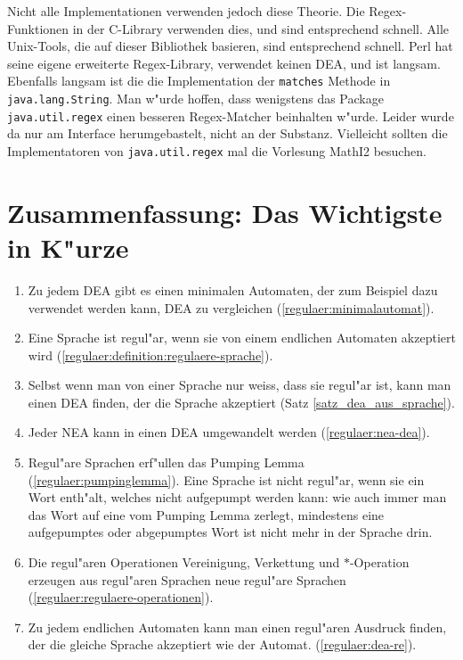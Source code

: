 \begin{sloppypar} %
Nicht alle Implementationen verwenden jedoch diese Theorie. Die
Regex-Funktionen in der C-Library verwenden dies, und sind entsprechend
schnell. Alle Unix-Tools, die auf dieser Bibliothek basieren, sind
entsprechend schnell. Perl hat seine eigene erweiterte Regex-Library,
verwendet keinen DEA, und ist langsam. Ebenfalls langsam ist die
die Implementation der {\tt matches} Methode in {\tt java.lang.String}.
Man w"urde hoffen, dass wenigstens das Package {\tt java.util.regex} einen
besseren Regex-Matcher beinhalten w"urde. Leider wurde da nur am
Interface herumgebastelt, nicht an der Substanz. Vielleicht sollten
die Implementatoren von {\tt java.util.regex} mal die Vorlesung MathI2
besuchen.
\end{sloppypar}

\section{Zusammenfassung: Das Wichtigste in K"urze}
\begin{enumerate}
\item Zu jedem DEA gibt es einen
minimalen Automaten, der zum Beispiel dazu verwendet werden kann,
DEA zu vergleichen
(\ref{regulaer:minimalautomat}).
\item Eine Sprache ist regul"ar, wenn sie von einem endlichen Automaten
akzeptiert wird (\ref{regulaer:definition:regulaere-sprache}).
\item Selbst wenn man von einer Sprache nur weiss, dass sie regul"ar
ist, kann man einen DEA finden, der die Sprache akzeptiert
(Satz \ref{satz_dea_aus_sprache}).
\item Jeder NEA kann in einen DEA umgewandelt werden (\ref{regulaer:nea-dea}).
\item Regul"are Sprachen erf"ullen das Pumping Lemma
(\ref{regulaer:pumpinglemma}).
Eine Sprache ist nicht regul"ar, wenn sie ein Wort enth"alt, welches
nicht aufgepumpt werden kann: wie auch immer man das Wort
auf eine vom Pumping Lemma zerlegt, mindestens eine aufgepumptes
oder abgepumptes Wort ist nicht mehr in der Sprache drin.
\item Die regul"aren Operationen Vereinigung, Verkettung und $*$-Operation
erzeugen aus regul"aren Sprachen neue regul"are Sprachen
(\ref{regulaer:regulaere-operationen}).
\item Zu jedem endlichen Automaten kann man einen regul"aren Ausdruck
finden, der die gleiche Sprache akzeptiert wie der Automat.
(\ref{regulaer:dea-re}).
\end{enumerate}
